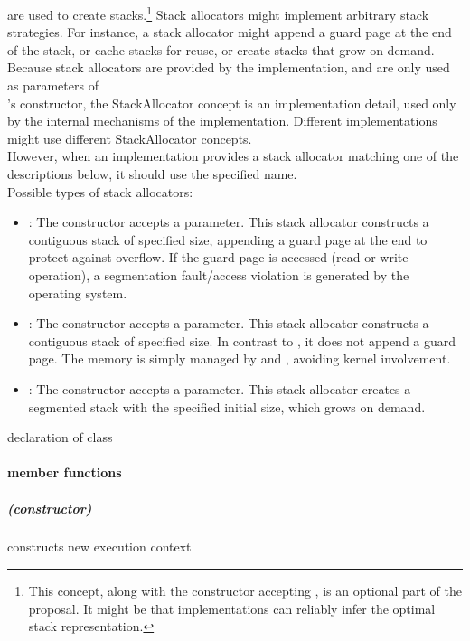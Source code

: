\label{subsec:stackalloc}
are used to create stacks.\footnote{This concept, along with the \ectx
constructor accepting , is an optional part of the
proposal. It might be that implementations can reliably infer the optimal
stack representation.} Stack allocators might implement arbitrary stack
strategies. For instance, a stack allocator might append a guard page at the
end of the stack, or cache stacks for reuse, or create stacks that grow on
demand.\\
Because stack allocators are provided by the implementation, and are only used
as parameters of\\
\ectx's constructor, the StackAllocator concept is an implementation detail,
used only by the internal mechanisms of the \ectx implementation. Different
implementations might use different StackAllocator concepts.\\
However, when an implementation provides a stack allocator matching one of
the descriptions below, it should use the specified name.\\
Possible types of stack allocators:
\begin{itemize}
    \item {}: The constructor accepts a 
        parameter. This stack allocator constructs a contiguous stack of
        specified size, appending a guard page at the end to protect against
        overflow. If the guard page is accessed (read or write operation), a
        segmentation fault/access violation is generated by the operating
        system.
    \item {}: The constructor accepts a  parameter.
        This stack allocator constructs a contiguous stack of specified size.
        In contrast to , it does not append a guard
        page. The memory is simply managed by 
        and , avoiding kernel involvement.
    \item {}: The constructor accepts a  parameter.
        This stack allocator creates a segmented stack with the specified
        initial size, which grows on demand.
\end{itemize}

declaration of class \ectx
{}
\paragraph*{member functions}
\subparagraph*{(constructor)}
constructs new execution context\\

